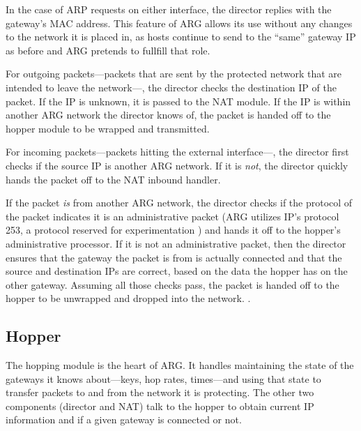 \par In the case of \ac{ARP} requests on either interface, the director replies with the gateway's \ac{MAC} address. This feature of \ac{ARG} allows its use without any changes to the network it is placed in, as hosts continue to send to the ``same'' gateway IP as before and \ac{ARG} pretends to fullfill that role. 

\par For outgoing packets---packets that are sent by the protected network that are intended to leave the network---, the director checks the destination \ac{IP} of the packet. If the IP is unknown, it is passed to the \ac{NAT} module. If the IP is within another \ac{ARG} network the director knows of, the packet is handed off to the hopper module to be wrapped and transmitted.

\par For incoming packets---packets hitting the external interface---, the director first checks if the source IP is another ARG network. If it is \textit{not}, the director quickly hands the packet off to the NAT inbound handler.

\par If the packet \textit{is} from another ARG network, the director checks if the protocol of the packet indicates it is an administrative packet (ARG utilizes IP's protocol 253, a protocol reserved for experimentation \cite{IANAPorts}) and hands it off to the hopper's administrative processor. If it is not an administrative packet, then the director ensures that the gateway the packet is from is actually connected and that the source and destination IPs are correct, based on the data the hopper has on the other gateway. Assuming all those checks pass, the packet is handed off to the hopper to be unwrapped and dropped into the network.
.

\subsection{Hopper}
\label{sec:arg_hopper}
\par The hopping module is the heart of ARG. It handles maintaining the state of the gateways it knows about---keys, hop rates, times---and using that state to transfer packets to and from the network it is protecting. The other two components (director and \ac{NAT}) talk to the hopper to obtain current IP information and if a given gateway is connected or not.

